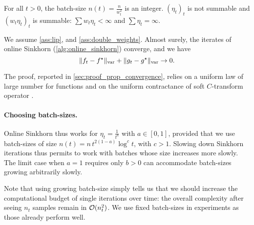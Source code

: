 \begin{assumption}\label{ass:double_weights}
    For all $t > 0$, the batch-size $n(t) = \frac{n}{w_t^2}$ is an integer. ${(\eta_t)}_t$ is
    not summable and ${(w_t \eta_t)}_t$ is summable: $\sum w_t \eta_t <
    \infty$ and $\sum \eta_t = \infty$.
\end{assumption}

\begin{proposition}\label{prop:convergence_true}
    We assume \autoref{ass:lip}, and
    \ref{ass:double_weights}. Almost surely, the iterates of online Sinkhorn
    (\autoref{alg:online_sinkhorn}) converge, and we have
    \begin{equation}
        \Vert f_t - f^\star \Vert_{\text{\upshape var}} + \Vert g_t - g^\star \Vert_{\text{\upshape var}} \to 0.
    \end{equation}
\end{proposition}

The proof, reported in \autoref{sec:proof_prop_convergence}, relies on a uniform law of large number for functions \citep[][chapter 19]{van_der_vaart_asymptotic_2000} and on the uniform contractance of soft $C$-transform operator \citep[e.g.][Proposition 19]{vialard2019elementary}.

\paragraph{Choosing batch-sizes.}

Online Sinkhorn thus works for $\eta_t = \frac{1}{t^a}$ with $a \in [0, 1]$,
provided that we use batch-sizes of size $n(t) = n\, t^{2(1-a)} \log^c t$, with $c >
1$. Slowing down Sinkhorn iterations thus permits to work with batches whose
size increases more slowly. The limit case when $a = 1$ requires only $b > 0$
can accommodate batch-sizes growing arbitrarily slowly. 

Note that using growing batch-size simply tells us that we should increase the
computational budget of single iterations over time: the overall complexity
after seeing $n_t$ samples remain in $\mathcal{O}(n_t^2)$. We use fixed batch-sizes in
experiments as those already perform well.